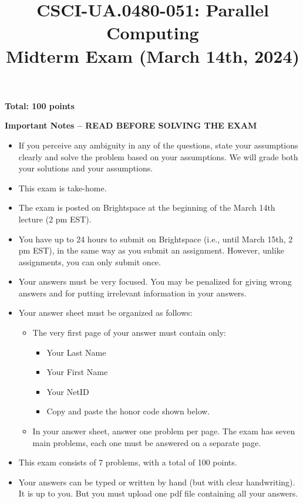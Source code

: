 \documentclass{article}
\title{CSCI-UA.0480-051: Parallel Computing \\ Midterm Exam (March 14th, 2024)}
\author{}
\date{}
\begin{document}
\maketitle

\textbf{Total: 100 points}

\textbf{Important Notes -- READ BEFORE SOLVING THE EXAM}

\begin{itemize}
    \item If you perceive any ambiguity in any of the questions, state your assumptions clearly and solve the problem based on your assumptions. We will grade both your solutions and your assumptions.
    \item This exam is take-home.
    \item The exam is posted on Brightspace at the beginning of the March 14th lecture (2 pm EST).
    \item You have up to 24 hours to submit on Brightspace (i.e., until March 15th, 2 pm EST), in the same way as you submit an assignment. However, unlike assignments, you can only submit once.
    \item Your answers must be very focused. You may be penalized for giving wrong answers and for putting irrelevant information in your answers.
    \item Your answer sheet must be organized as follows:
    \begin{itemize}
        \item The very first page of your answer must contain only:
        \begin{itemize}
            \item Your Last Name
            \item Your First Name
            \item Your NetID
            \item Copy and paste the honor code shown below.
        \end{itemize}
        \item In your answer sheet, answer one problem per page. The exam has seven main problems, each one must be answered on a separate page.
    \end{itemize}
    \item This exam consists of 7 problems, with a total of 100 points.
    \item Your answers can be typed or written by hand (but with clear handwriting). It is up to you. But you must upload one pdf file containing all your answers.
\end{itemize}
\end{document}
